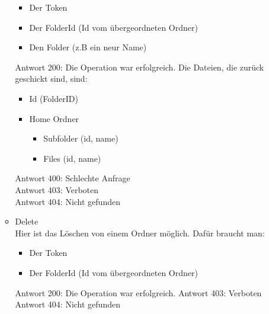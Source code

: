 \begin{enumerate}
\begin{itemize}
\begin{itemize}
\item Der Token
\item Der FolderId (Id vom \"ubergeordneten Ordner) 
\item Den Folder (z.B ein neur Name) 
\end{itemize}
Antwort 200: Die Operation war erfolgreich. Die Dateien, die zur\"uck geschickt sind, sind:
\begin{itemize}
\item Id (FolderID)
\item Home Ordner
	\begin{itemize}
	\item Subfolder (id, name)
	\item Files (id, name)
	\end{itemize}
\end{itemize}
Antwort 400: Schlechte Anfrage \\
Antwort 403: Verboten \\
Antwort 404: Nicht gefunden
\item Delete \\
Hier ist das L\"oschen von einem Ordner m\"oglich. Daf\"ur braucht man: 
\begin{itemize}
\item Der Token
\item Der FolderId (Id vom \"ubergeordneten Ordner) 
\end{itemize}
Antwort 200: Die Operation war erfolgreich.
Antwort 403: Verboten \\
Antwort 404: Nicht gefunden
\end{itemize}
\end{enumerate}
